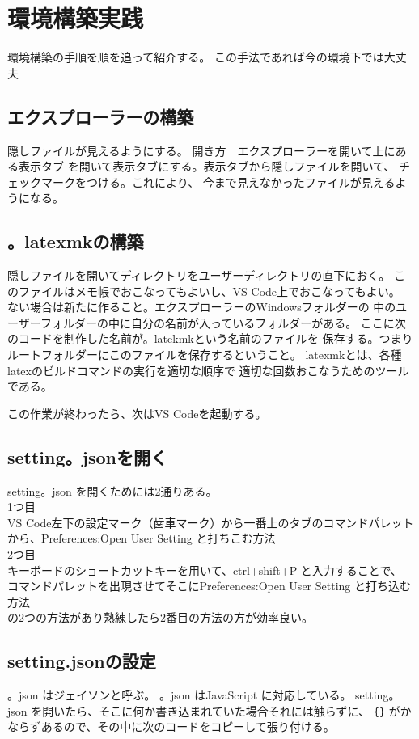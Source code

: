 \documentclass{ltjsarticle}
\begin{document}
\section{環境構築実践}
環境構築の手順を順を追って紹介する。
この手法であれば今の環境下では大丈夫
\subsection{エクスプローラーの構築}
隠しファイルが見えるようにする。
開き方　エクスプローラーを開いて上にある表示タブ
を開いて表示タブにする。表示タブから隠しファイルを開いて、
チェックマークをつける。これにより、
今まで見えなかったファイルが見えるようになる。

\subsection{。latexmkの構築} %

\label{sub:。latexmkの構築}
隠しファイルを開いてディレクトリをユーザーディレクトリの直下におく。
このファイルはメモ帳でおこなってもよいし、VS Code上でおこなってもよい。
ない場合は新たに作ること。エクスプローラーのWindowsフォルダーの
中のユーザーフォルダーの中に自分の名前が入っているフォルダーがある。
ここに次のコードを制作した名前が。latekmkという名前のファイルを
保存する。つまりルートフォルダーにこのファイルを保存するということ。
latexmkとは、各種latexのビルドコマンドの実行を適切な順序で
適切な回数おこなうためのツールである。


この作業が終わったら、次はVS Codeを起動する。
\subsection{setting。jsonを開く}
setting。json を開くためには2通りある。\\
1つ目\\
VS Code左下の設定マーク（歯車マーク）から一番上のタブのコマンドパレット
から、Preferences:Open User Setting と打ちこむ方法\\
2つ目\\
キーボードのショートカットキーを用いて、ctrl+shift+P と入力することで、
コマンドパレットを出現させてそこにPreferences:Open User Setting
と打ち込む方法\\
の2つの方法があり熟練したら2番目の方法の方が効率良い。
\subsection{setting.jsonの設定}
。json はジェイソンと呼ぶ。
。json はJavaScript に対応している。
setting。json を開いたら、そこに何か書き込まれていた場合それには触らずに、
\verb|{}|
がかならずあるので、その中に次のコードをコピーして張り付ける。
\end{document}
